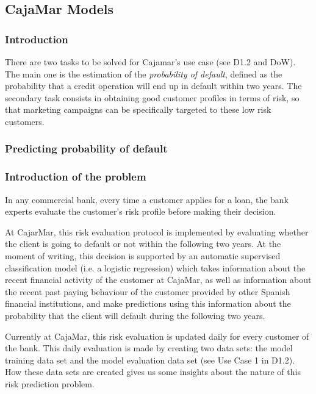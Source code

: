 \subsection{CajaMar Models}
\label{Section:CajaMarModels}

\subsubsection{Introduction}

There are two tasks to be solved for Cajamar's use case (see D1.2 and DoW). The main one is
the estimation of the \emph{probability of default}, defined as the probability that a
credit operation will end up in default within two years. The secondary task consists in obtaining 
good customer profiles in terms of risk, so that marketing campaigns can be
specifically targeted to these low risk customers. 

\subsubsection{Predicting probability of default}

\subsubsection*{Introduction of the problem} 

In any commercial bank, every time a customer applies for a loan, the bank experts evaluate the customer's risk profile before making their decision. 

At CajarMar, this risk evaluation protocol is implemented by evaluating whether the client is going to default or not within the following two years. At the moment of writing, this decision is supported by an automatic supervised classification model (i.e. a logistic regression) which takes information about the recent financial activity of the customer at CajaMar, as well as information about the recent past paying behaviour of the customer provided by other Spanish financial institutions, and make predictions using this information about the probability that the client will default during the following two years.

Currently at CajaMar, this risk evaluation is updated daily for every customer of the bank. This daily evaluation is made by creating two data sets: the model training data set and the model evaluation data set (see Use Case 1 in D1.2). How these data sets are created gives us some insights about the nature of this risk prediction problem. 

